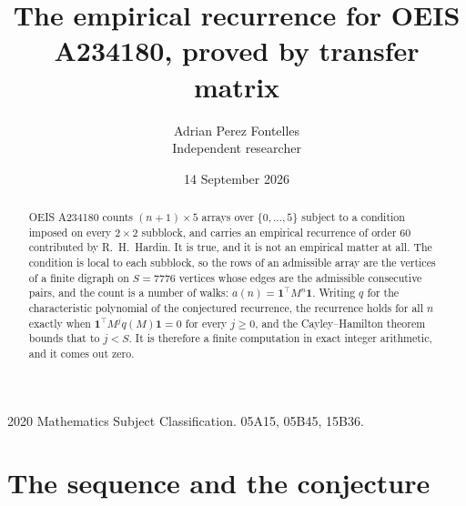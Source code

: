\documentclass[11pt,a4paper]{article}
\title{The empirical recurrence for OEIS A234180, proved by transfer matrix}
\author{Adrian Perez Fontelles\\ \small Independent researcher}
\date{14 September 2026}
\theoremstyle{plain}
\theoremstyle{definition}
\begin{document}
\maketitle

\begin{abstract}
OEIS A234180 counts $(n+1)\times5$ arrays over $\{0,\dots,5\}$ subject to a condition imposed on
every $2\times2$ subblock, and carries an empirical recurrence of order $60$ contributed
by R.~H.~Hardin. It is true, and it is not an empirical matter at all. The condition is local
to each subblock, so the rows of an admissible array are the vertices of a finite digraph
on $S=7776$ vertices whose edges are the admissible consecutive pairs, and the count is a
number of walks: $a(n)=\mathbf{1}^{\!\top}M^{n}\mathbf{1}$. Writing $q$
for the characteristic polynomial of the conjectured recurrence, the recurrence holds for all
$n$ exactly when $\mathbf{1}^{\!\top}M^{j}q(M)\mathbf{1}=0$ for every $j\ge0$, and the
Cayley--Hamilton theorem bounds that to $j<S$. It is therefore a finite computation in exact
integer arithmetic, and it comes out zero.
\end{abstract}

\noindent\small 2020 Mathematics Subject Classification. 05A15, 05B45, 15B36.\normalsize

\section{The sequence and the conjecture}
\end{document}
